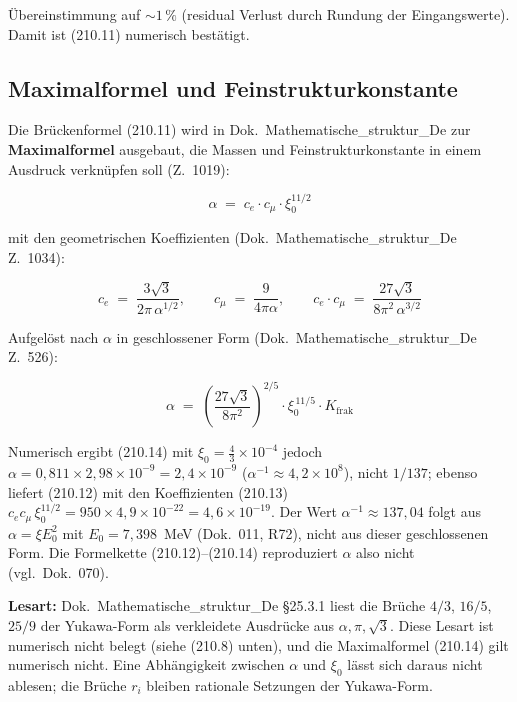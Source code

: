 Übereinstimmung auf $\sim 1\,\%$ (residual Verlust durch Rundung der
Eingangswerte). Damit ist (210.11) numerisch bestätigt.

\subsection*{Maximalformel und Feinstrukturkonstante}

Die Brückenformel (210.11) wird in Dok.~Mathematische\_struktur\_De zur
\textbf{Maximalformel} ausgebaut, die Massen und Feinstrukturkonstante in einem Ausdruck
verknüpfen soll (Z.~1019):

\begin{equation}
  \boxed{\;\alpha \;=\; c_e \cdot c_\mu \cdot \xi_0^{11/2}\;}
  \tag{210.12}
\end{equation}

mit den geometrischen Koeffizienten (Dok.~Mathematische\_struktur\_De
Z.~1034):

\begin{equation}
  c_e \;=\; \frac{3\sqrt{3}}{2\pi\,\alpha^{1/2}},
  \qquad
  c_\mu \;=\; \frac{9}{4\pi\alpha},
  \qquad
  c_e \cdot c_\mu \;=\; \frac{27\sqrt{3}}{8\pi^2\,\alpha^{3/2}}
  \tag{210.13}
\end{equation}

Aufgelöst nach $\alpha$ in geschlossener Form
(Dok.~Mathematische\_struktur\_De Z.~526):

\begin{equation}
  \boxed{\;\alpha \;=\; \left(\frac{27\sqrt{3}}{8\pi^2}\right)^{2/5}
  \cdot \xi_0^{\,11/5} \cdot K_{\text{frak}}\;}
  \tag{210.14}
\end{equation}

Numerisch ergibt (210.14) mit $\xi_0 = \tfrac43\times10^{-4}$ jedoch
$\alpha = 0{,}811 \times 2{,}98\times10^{-9} = 2{,}4\times10^{-9}$
($\alpha^{-1} \approx 4{,}2\times10^{8}$), nicht $1/137$; ebenso liefert
(210.12) mit den Koeffizienten (210.13) $c_e c_\mu\,\xi_0^{11/2} = 950 \times
4{,}9\times10^{-22} = 4{,}6\times10^{-19}$. Der Wert $\alpha^{-1} \approx 137{,}04$
folgt aus $\alpha = \xi E_0^2$ mit $E_0 = 7{,}398$~MeV (Dok.~011, R72), nicht aus
dieser geschlossenen Form. Die Formelkette (210.12)--(210.14) reproduziert
$\alpha$ also nicht (vgl.\ Dok.~070).

\textbf{Lesart:} Dok.~Mathematische\_struktur\_De §25.3.1 liest die
Brüche $4/3$, $16/5$, $25/9$ der Yukawa-Form als verkleidete
Ausdrücke aus $\alpha, \pi, \sqrt{3}$. Diese Lesart ist numerisch
nicht belegt (siehe (210.8) unten), und die Maximalformel (210.14)
gilt numerisch nicht. Eine Abhängigkeit zwischen $\alpha$ und
$\xi_0$ lässt sich daraus nicht ablesen; die Brüche $r_i$ bleiben
rationale Setzungen der Yukawa-Form.

